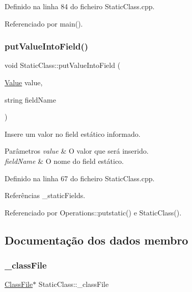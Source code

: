 Definido na linha 84 do ficheiro Static\+Class.\+cpp.



Referenciado por main().

\mbox{\label{classStaticClass_a010cf8cd301416ef4408c066e0fbcda6}} 
\subsubsection{\texorpdfstring{put\+Value\+Into\+Field()}{putValueIntoField()}}
{\footnotesize\ttfamily void Static\+Class\+::put\+Value\+Into\+Field (\begin{DoxyParamCaption}\item[{\hyperlink{structValue}{Value}}]{value,  }\item[{string}]{field\+Name }\end{DoxyParamCaption})}



Insere um valor no field estático informado. 


\begin{DoxyParams}{Parâmetros}
{\em value} & O valor que será inserido. \\
\hline
{\em field\+Name} & O nome do field estático. \\
\hline
\end{DoxyParams}


Definido na linha 67 do ficheiro Static\+Class.\+cpp.



Referências \+\_\+static\+Fields.



Referenciado por Operations\+::putstatic() e Static\+Class().



\subsection{Documentação dos dados membro}
\mbox{\label{classStaticClass_ae54948d5ec18075dd5b68c7faf4ccc8b}} 
\subsubsection{\texorpdfstring{\+\_\+class\+File}{\_classFile}}
{\footnotesize\ttfamily \hyperlink{classClassFile}{Class\+File}$\ast$ Static\+Class\+::\+\_\+class\+File\hspace{0.3cm}{\ttfamily [private]}}

